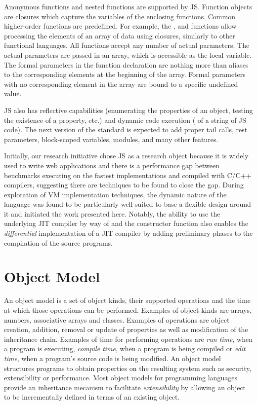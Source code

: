 Anonymous functions and nested functions are supported by JS. Function objects
are closures which capture the variables of the enclosing functions. Common
higher-order functions are predefined. For example, the , 
and  functions allow processing the elements of an array of data
using closures, similarly to other functional languages. All functions accept
any number of actual parameters. The actual parameters are passed in an array,
which is accessible as the  local variable. The formal parameters
in the function declaration are nothing more than aliases to the corresponding
elements at the beginning of the array. Formal parameters with no corresponding
element in the array are bound to a specific undefined value.

JS also has reflective capabilities (enumerating the properties of an object,
testing the existence of a property, etc.) and dynamic code execution
( of a string of JS code).  The next version of the standard is
expected to add proper tail calls, rest parameters, block-scoped variables,
modules, and many other features.

Initially, our research initiative chose JS as a research object because it is
widely used to write web applications and there is a performance gap between
benchmarks executing on the fastest implementations and compiled with C/C++
compilers, suggesting there are techniques to be found to close the gap.
During exploration of VM implementation techniques, the dynamic nature of the
language was found to be particularly well-suited to base a flexible design
around it and initiated the work presented here. Notably, the ability to use
the underlying JIT compiler by way of  and the 
constructor function also enables the \textit{differential} implementation of a
JIT compiler by adding preliminary phases to the compilation of the source
programs.

\section{Object Model}

An object model is a set of object kinds, their supported operations and the
time at which those operations can be performed.  Examples of object kinds are
arrays, numbers, associative arrays and classes.  Examples of operations are
object creation, addition, removal or update of properties as well as
modification of the inheritance chain. Examples of time for performing
operations are \textit{run time}, when a program is executing, \textit{compile
time}, when a program is being compiled or \textit{edit time}, when a program's
source code is being modified. An object model structures programs to obtain
properties on the resulting system such as security, extensibility or
performance. Most object models for programming languages provide an
inheritance mecanism to facilitate \textit{extensibility} by allowing an object
to be incrementally defined in terms of an existing object.


